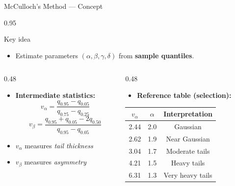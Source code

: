 \documentclass[9pt, aspectratio=169, t]{beamer}
\begin{document}
\begin{frame}{McCulloch's Method --- Concept}
    \begin{cminipage}{0.95\textwidth}
\begin{block}{Key idea}
\begin{itemize}\setlength{\itemsep}{0pt}
    \item Estimate parameters $(\alpha, \beta, \gamma, \delta)$ from \textbf{sample quantiles}.
\end{itemize}
\end{block}

\begin{columns}[T]
\begin{column}{0.48\textwidth}
\begin{itemize}\setlength{\itemsep}{0pt}
    \item \textbf{Intermediate statistics:}
$$v_\alpha = \frac{q_{0.95} - q_{0.05}}{q_{0.75} - q_{0.25}}$$
$$v_\beta = \frac{q_{0.95} + q_{0.05} - 2q_{0.50}}{q_{0.95} - q_{0.05}}$$
    \item $v_\alpha$ measures \textit{tail thickness}
    \item $v_\beta$ measures \textit{asymmetry}
\end{itemize}
\end{column}
\begin{column}{0.48\textwidth}
\begin{itemize}\setlength{\itemsep}{0pt}
    \item \textbf{Reference table (selection):}
\end{itemize}

\renewcommand{\arraystretch}{1.2}
\begin{tabular}{ccc}
\toprule
$v_\alpha$ & $\alpha$ & Interpretation \\
\midrule
2.44 & 2.0 & Gaussian \\
2.62 & 1.9 & Near Gaussian \\
3.04 & 1.7 & Moderate tails \\
4.21 & 1.5 & Heavy tails \\
6.31 & 1.3 & Very heavy tails \\
\bottomrule
\end{tabular}
\end{column}
\end{columns}
    \end{cminipage}
\end{frame}
\end{document}
